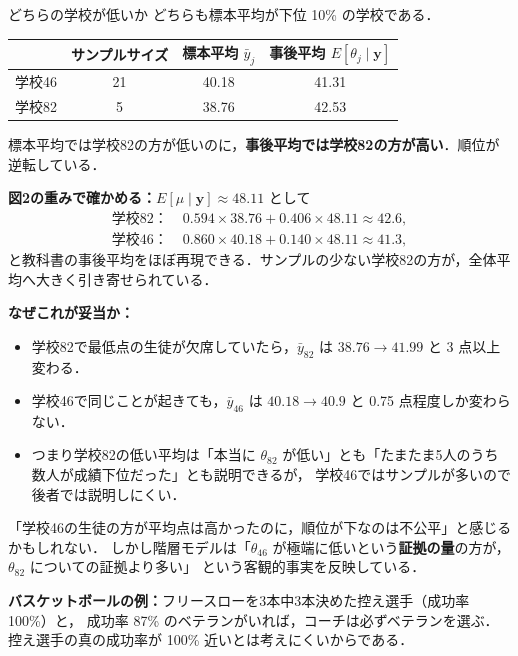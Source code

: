 \documentclass[lualatex,ja=standard,a4paper,12pt]{bxjsarticle}
\begin{document}
\begin{exbox}{どちらの学校が低いか}
どちらも標本平均が下位 10\% の学校である．

\begin{center}
\renewcommand{\arraystretch}{1.4}
\begin{tabular}{lccc}
\toprule
 & サンプルサイズ & 標本平均 $\bar{y}_j$ & 事後平均 $E[\theta_j \mid \bm{y}]$ \\
\midrule
学校46 & 21 & 40.18 & 41.31 \\
学校82 & 5 & 38.76 & 42.53 \\
\bottomrule
\end{tabular}
\end{center}

標本平均では学校82の方が低いのに，\textbf{事後平均では学校82の方が高い}．順位が逆転している．

\medskip
\noindent\textbf{図2の重みで確かめる：}$E[\mu \mid \bm{y}] \approx 48.11$ として
\begin{align*}
  \text{学校82：} &\; 0.594 \times 38.76 + 0.406 \times 48.11 \approx 42.6, \\
  \text{学校46：} &\; 0.860 \times 40.18 + 0.140 \times 48.11 \approx 41.3,
\end{align*}
と教科書の事後平均をほぼ再現できる．サンプルの少ない学校82の方が，全体平均へ大きく引き寄せられている．
\end{exbox}

\noindent\textbf{なぜこれが妥当か：}
\begin{itemize}
  \item 学校82で最低点の生徒が欠席していたら，$\bar{y}_{82}$ は $38.76 \to 41.99$ と 3 点以上変わる．
  \item 学校46で同じことが起きても，$\bar{y}_{46}$ は $40.18 \to 40.9$ と 0.75 点程度しか変わらない．
  \item つまり学校82の低い平均は「本当に $\theta_{82}$ が低い」とも「たまたま5人のうち数人が成績下位だった」とも説明できるが，
        学校46ではサンプルが多いので後者では説明しにくい．
\end{itemize}

\begin{pointbox}
「学校46の生徒の方が平均点は高かったのに，順位が下なのは不公平」と感じるかもしれない．
しかし階層モデルは「$\theta_{46}$ が極端に低いという\textbf{証拠の量}の方が，$\theta_{82}$ についての証拠より多い」
という客観的事実を反映している．

\medskip
\textbf{バスケットボールの例：}フリースローを3本中3本決めた控え選手（成功率 100\%）と，
成功率 87\% のベテランがいれば，コーチは必ずベテランを選ぶ．
控え選手の真の成功率が 100\% 近いとは考えにくいからである．
\end{pointbox}
\end{document}
